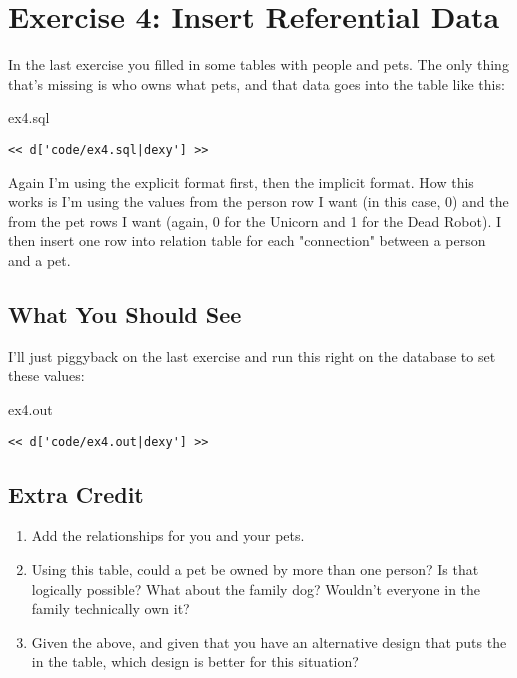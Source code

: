 \chapter{Exercise 4: Insert Referential Data}

In the last exercise you filled in some tables with people and pets.
The only thing that's missing is who owns what pets, and that data 
goes into the  table like this:

\begin{code}{ex4.sql}
\begin{Verbatim}
<< d['code/ex4.sql|dexy'] >>
\end{Verbatim}
\end{code}

Again I'm using the explicit format first, then the implicit format.
How this works is I'm using the  values from the person
row I want (in this case, 0) and the  from the pet rows
I want (again, 0 for the Unicorn and 1 for the Dead Robot).  I then
insert one row into  relation table for each 
"connection" between a person and a pet.

\section{What You Should See}

I'll just piggyback on the last exercise and run this right on the
 database to set these values:

\begin{code}{ex4.out}
\begin{Verbatim}
<< d['code/ex4.out|dexy'] >>
\end{Verbatim}
\end{code}


\section{Extra Credit}

\begin{enumerate}
\item Add the relationships for you and your pets.
\item Using this table, could a pet be owned by more than one person?  Is that logically possible?  What about the family dog? Wouldn't everyone in the family technically own it?
\item Given the above, and given that you have an alternative design that puts the  in the  table, which design is better for this situation?
\end{enumerate}


